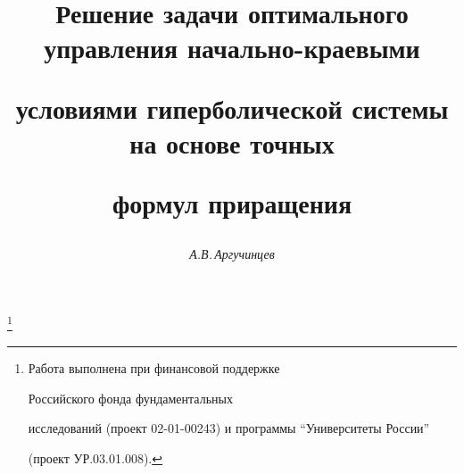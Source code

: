 




% 





\newcommand{\la}{\langle}


\newcommand{\ra}{\rangle}


\newcommand{\iil}{\iint\limits}


\newcommand{\il}{\int\limits}


\newcommand{\vraisup}{\operatornamewithlimits{vrai~sup}}


\newcommand{\tts}[1]{}










\setcounter{page}{23}















\author{\it А.В.\,Аргучинцев}




\title{Решение задачи оптимального управления начально-краевыми


условиями гиперболической системы на основе точных


формул приращения}


\thanks{Работа выполнена при финансовой поддержке 


Российского фонда фундаментальных


исследований (проект 02-01-00243) и программы ``Университеты России''


(проект УР.03.01.008).}





